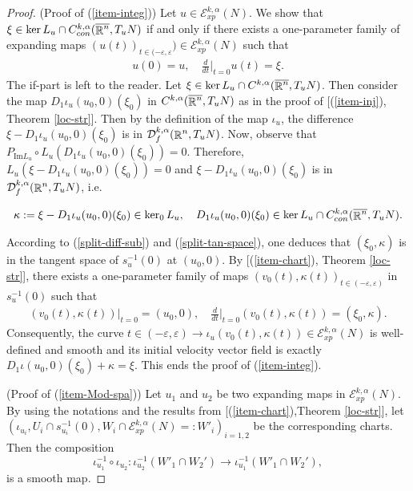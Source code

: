 \documentclass[a4paper,11pt,reqno]{amsart}
\def\R{\mathop{\rm \mathbb{R}}\nolimits}
\newcommand{\Ent}{\mathcal{E}}
\newcommand{\Ima}{\text{Im}}
\begin{document}
\begin{proof}
(Proof of (\ref{item-integ})) Let $u\in \Ent_{xp}^{k,\alpha}(N)$. We show that $\xi\in\ker L_u\cap C_{con}^{k,\alpha}(\overline{\R^n},T_uN)$ if and only if there exists a one-parameter family of expanding maps $(u(t))_{t\in(-\varepsilon,\varepsilon})\in \Ent_{xp}^{k,\alpha}(N)$ such that 
\begin{eqnarray*}
u(0)=u,\quad \frac{d}{dt}\bigg\rvert_{t=0}u(t)=\xi.
\end{eqnarray*}
The \guillemotleft if\guillemotright -part is left to the reader. Let $\xi\in\ker L_u\cap C^{k,\alpha}(\overline{\R^n},T_uN)$. Then consider the map $D_1\iota_u(u_0,0)(\xi_0)$ in $C^{k,\alpha}(\overline{\R^n},T_uN)$ as in the proof of [(\ref{item-inj}), Theorem \ref{loc-str}]. Then by the definition of the map $\iota_u$, the difference $\xi-D_1\iota_u(u_0,0)(\xi_0)$ is in $\mathcal{D}_f^{k,\alpha}(\R^n,T_uN)$. Now, observe that $P_{\Ima L_u}\circ L_u(D_1\iota_u(u_0,0)(\xi_0))=0$. Therefore, $L_u(\xi-D_1\iota_u(u_0,0)(\xi_0))=0$ and $\xi-D_1\iota_u(u_0,0)(\xi_0)$ is in $\mathcal{D}_f^{k,\alpha}(\R^n,T_uN)$, i.e. 

\begin{eqnarray*}
\kappa:=\xi-D_1\iota_u(u_0,0)(\xi_0)\in\ker_0L_u,\quad D_1\iota_u(u_0,0)(\xi_0)\in \ker L_u\cap C_{con}^{k,\alpha}(\overline{\R^n},T_uN).
\end{eqnarray*}

According to (\ref{split-diff-sub}) and (\ref{split-tan-space}), one deduces that $(\xi_0,\kappa)$ is in the tangent space of $s_u^{-1}(0)$ at $(u_0,0)$. By [(\ref{item-chart}), Theorem \ref{loc-str}], there exists a one-parameter family of maps $(v_0(t),\kappa(t))_{t\in(-\varepsilon,\varepsilon)}$ in $s_u^{-1}(0)$ such that
\begin{eqnarray*}
(v_0(t),\kappa(t))|_{t=0}=(u_0,0),\quad \frac{d}{dt}\bigg\rvert_{t=0}(v_0(t),\kappa(t))=(\xi_0,\kappa).
\end{eqnarray*}
Consequently, the curve $t\in(-\varepsilon,\varepsilon)\rightarrow\iota_u(v_0(t),\kappa(t))\in \Ent_{xp}^{k,\alpha}(N)$ is well-defined and smooth and its initial velocity vector field is exactly $D_1\iota(u_0,0)(\xi_0)+\kappa=\xi$. This ends the proof of (\ref{item-integ}).

(Proof of (\ref{item-Mod-spa})) Let $u_1$ and $u_2$ be two expanding maps in $\Ent_{xp}^{k,\alpha}(N)$. By using the notations and the results from [(\ref{item-chart}),Theorem \ref{loc-str}], let $(\iota_{u_i},U_i\cap s_{u_i}^{-1}(0),W_i\cap \Ent_{xp}^{k,\alpha}(N)=:W'_i)_{i=1,2}$ be the corresponding charts. Then the composition 
$$\iota_{u_1}^{-1}\circ \iota_{u_2}:\iota_{u_2}^{-1}(W'_1\cap W_2')\rightarrow \iota_{u_1}^{-1}(W'_1\cap W_2'),$$ is a smooth map.


\end{proof}
\end{document}
